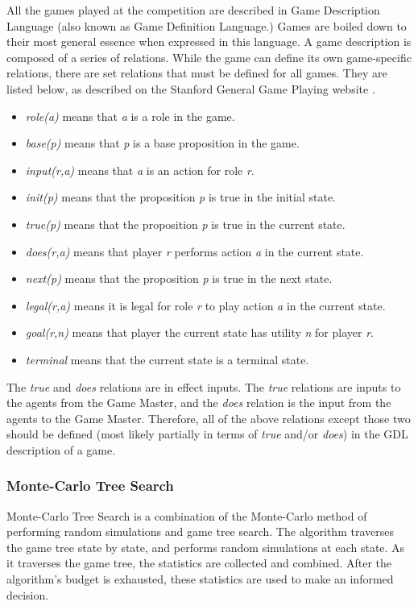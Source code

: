 \documentclass[letterpaper]{article}
\begin{document}
All the games played at the competition are described in Game Description Language (also known as Game Definition Language.) Games are boiled down to their most general essence when expressed in this language. A game description is composed of a series of relations. While the game can define its own game-specific relations, there are set relations that must be defined for all games. They are listed below, as described on the Stanford General Game Playing website \cite{StanfordGGP}.
\begin{itemize}
\item \emph{role(a)} means that \emph{a} is a role in the game.
\item \emph{base(p)} means that \emph{p} is a base proposition in the game.
\item \emph{input(r,a)} means that \emph{a} is an action for role \emph{r}.
\item \emph{init(p)} means that the proposition \emph{p} is true in the initial state.
\item \emph{true(p)} means that the proposition \emph{p} is true in the current state.
\item \emph{does(r,a)} means that player \emph{r} performs action \emph{a} in the current state.
\item \emph{next(p)} means that the proposition \emph{p} is true in the next state.
\item \emph{legal(r,a)} means it is legal for role \emph{r} to play action \emph{a} in the current state.
\item \emph{goal(r,n)} means that player the current state has utility \emph{n} for player \emph{r}.
\item \emph{terminal} means that the current state is a terminal state.
\end{itemize}

The \emph{true} and \emph{does} relations are in effect inputs. The \emph{true} relations are inputs to the agents from the Game Master, and the \emph{does} relation is the input from the agents to the Game Master. Therefore, all of the above relations except those two should be defined (most likely partially in terms of \emph{true} and/or \emph{does}) in the GDL description of a game.

\subsubsection{Monte-Carlo Tree Search}
Monte-Carlo Tree Search is a combination of the Monte-Carlo method of performing random simulations and game tree search. The algorithm traverses the game tree state by state, and performs random simulations at each state. As it traverses the game tree, the statistics are collected and combined. After the algorithm's budget is exhausted, these statistics are used to make an informed decision.
\end{document}
